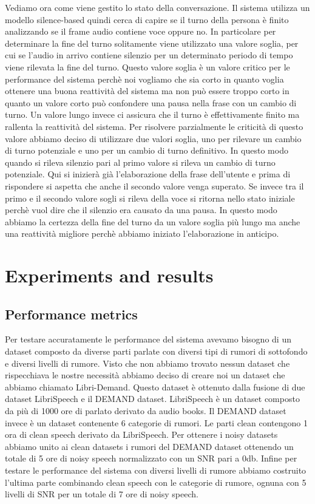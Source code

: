 \documentclass[12pt]{article}
\begin{document}
Vediamo ora come viene gestito lo stato della conversazione. Il sistema utilizza un modello silence-based quindi cerca di capire se il turno della persona è finito analizzando se il frame audio contiene voce oppure no. In particolare per determinare la fine del turno solitamente viene utilizzato una valore soglia, per cui se l'audio in arrivo contiene silenzio per un determinato periodo di tempo viene rilevata la fine del turno. Questo valore soglia è un valore critico per le performance del sistema perchè noi vogliamo che sia corto in quanto voglia ottenere una buona reattività del sistema ma non può essere troppo corto in quanto un valore corto può confondere una pausa nella frase con un cambio di turno. Un valore lungo invece ci assicura che il turno è effettivamente finito ma rallenta la reattività del sistema. Per risolvere parzialmente le criticità di questo valore abbiamo deciso di utilizzare due valori soglia, uno per rilevare un cambio di turno potenziale e uno per un cambio di turno definitivo. In questo modo quando si rileva silenzio pari al primo valore si rileva un cambio di turno potenziale. Qui si inizierà già l'elaborazione della frase dell'utente e prima di rispondere si aspetta che anche il secondo valore venga superato. Se invece tra il primo e il secondo valore sogli si rileva della voce si ritorna nello stato iniziale perchè vuol dire che il silenzio era causato da una pausa. In questo modo abbiamo la certezza della fine del turno da un valore soglia più lungo ma anche una reattività migliore perchè abbiamo iniziato l'elaborazione in anticipo.  

\section{Experiments and results}

\subsection{Performance metrics}

Per testare accuratamente le performance del sistema avevamo bisogno di un dataset composto da diverse parti parlate con diversi tipi di rumori di sottofondo e diversi livelli di rumore. Visto che non abbiamo trovato nessun dataset che rispecchiava le nostre necessità abbiamo deciso di creare noi un dataset che abbiamo chiamato Libri-Demand. Questo dataset è ottenuto dalla fusione di due dataset LibriSpeech e il DEMAND dataset. LibriSpeech è un dataset composto da più di 1000 ore di parlato derivato da audio books. Il DEMAND dataset invece è un dataset contenente 6 categorie di rumori.
Le parti clean contengono 1 ora di clean speech derivato da LibriSpeech. Per ottenere i noisy datasets abbiamo unito ai clean datasets i rumori del DEMAND dataset ottenendo un totale di 5 ore di noisy speech normalizzato con un SNR pari a 0db. Infine per testare le performance del sistema con diversi livelli di rumore abbiamo costruito l'ultima parte combinando clean speech con le categorie di rumore, ognuna con 5 livelli di SNR per un totale di 7 ore di noisy speech.
\end{document}
